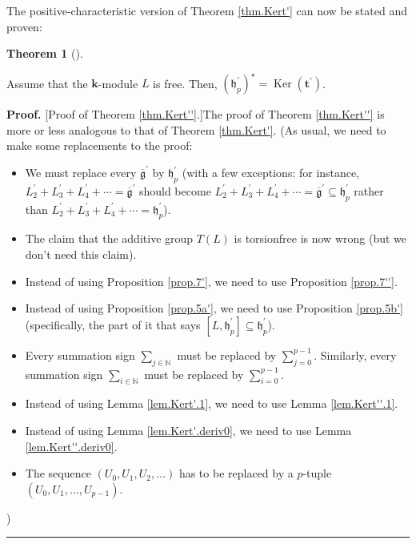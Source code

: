 \documentclass[numbers=enddot,12pt,final,onecolumn,notitlepage]{scrartcl}%
\theoremstyle{definition}
\newtheorem{theo}{Theorem}[section]
\newenvironment{theorem}[1][]
{\begin{theo}[#1]\begin{leftbar}}
{\end{leftbar}\end{theo}}
\newenvironment{proof}[1][Proof]{\noindent\textbf{#1.} }{\ \rule{0.5em}{0.5em}}
\let\sumnonlimits\sum
\renewcommand{\sum}{\sumnonlimits\limits}
\begin{document}
The positive-characteristic version of Theorem \ref{thm.Kert'} can now be
stated and proven:

\begin{theorem}
\label{thm.Kert''}Assume that the $\mathbf{k}$-module $L$ is free. Then,
$\left(  \mathfrak{h}_{p}^{\prime}\right)  ^{\star}=\operatorname*{Ker}\left(
\mathbf{t}^{\prime}\right)  $.
\end{theorem}

\begin{proof}
[Proof of Theorem \ref{thm.Kert''}.]The proof of Theorem \ref{thm.Kert''} is
more or less analogous to that of Theorem \ref{thm.Kert'}. (As usual, we need
to make some replacements to the proof:

\begin{itemize}
\item We must replace every $\overline{\mathfrak{g}}^{\prime}$ by
$\mathfrak{h}_{p}^{\prime}$ (with a few exceptions: for instance,
$L_{2}^{\prime}+L_{3}^{\prime}+L_{4}^{\prime}+\cdots=\overline{\mathfrak{g}%
}^{\prime}$ should become $L_{2}^{\prime}+L_{3}^{\prime}+L_{4}^{\prime}%
+\cdots=\overline{\mathfrak{g}}^{\prime}\subseteq\mathfrak{h}_{p}^{\prime}$
rather than $L_{2}^{\prime}+L_{3}^{\prime}+L_{4}^{\prime}+\cdots
=\mathfrak{h}_{p}^{\prime}$).

\item The claim that the additive group $T\left(  L\right)  $ is torsionfree
is now wrong (but we don't need this claim).

\item Instead of using Proposition \ref{prop.7'}, we need to use Proposition
\ref{prop.7''}.

\item Instead of using Proposition \ref{prop.5a'}, we need to use Proposition
\ref{prop.5b'} (specifically, the part of it that says $\left[  L,\mathfrak{h}%
_{p}^{\prime}\right]  \subseteq\mathfrak{h}_{p}^{\prime}$).

\item Every summation sign $\sum_{j\in\mathbb{N}}$ must be replaced by
$\sum_{j=0}^{p-1}$. Similarly, every summation sign $\sum_{i\in\mathbb{N}}$
must be replaced by $\sum_{i=0}^{p-1}$.

\item Instead of using Lemma \ref{lem.Kert'.1}, we need to use Lemma
\ref{lem.Kert''.1}.

\item Instead of using Lemma \ref{lem.Kert'.deriv0}, we need to use Lemma
\ref{lem.Kert''.deriv0}.

\item The sequence $\left(  U_{0},U_{1},U_{2},\ldots\right)  $ has to be
replaced by a $p$-tuple $\left(  U_{0},U_{1},\ldots,U_{p-1}\right)  $.
\end{itemize}

)
\end{proof}
\end{document}
